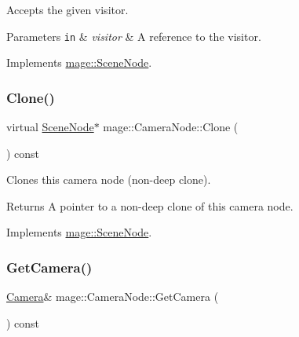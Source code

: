 Accepts the given visitor.


\begin{DoxyParams}[1]{Parameters}
\mbox{\tt in}  & {\em visitor} & A reference to the visitor. \\
\hline
\end{DoxyParams}


Implements \hyperlink{classmage_1_1_scene_node_a35fbfd49185fb61cb4e9edf56af35262}{mage\+::\+Scene\+Node}.

\hypertarget{classmage_1_1_camera_node_adf9a95250d1fd7e6bb9a5850a0aa7817}{}\label{classmage_1_1_camera_node_adf9a95250d1fd7e6bb9a5850a0aa7817} 
\subsubsection{\texorpdfstring{Clone()}{Clone()}}
{\footnotesize\ttfamily virtual \hyperlink{classmage_1_1_scene_node}{Scene\+Node}$\ast$ mage\+::\+Camera\+Node\+::\+Clone (\begin{DoxyParamCaption}{ }\end{DoxyParamCaption}) const\hspace{0.3cm}{\ttfamily [virtual]}}

Clones this camera node (non-\/deep clone).

\begin{DoxyReturn}{Returns}
A pointer to a non-\/deep clone of this camera node. 
\end{DoxyReturn}


Implements \hyperlink{classmage_1_1_scene_node_a85d62213a900cd8e45864b8cde5929e9}{mage\+::\+Scene\+Node}.

\hypertarget{classmage_1_1_camera_node_a823525438bea9a62cdcd2e42b79b19d9}{}\label{classmage_1_1_camera_node_a823525438bea9a62cdcd2e42b79b19d9} 
\subsubsection{\texorpdfstring{Get\+Camera()}{GetCamera()}}
{\footnotesize\ttfamily \hyperlink{classmage_1_1_camera}{Camera}\& mage\+::\+Camera\+Node\+::\+Get\+Camera (\begin{DoxyParamCaption}{ }\end{DoxyParamCaption}) const}

